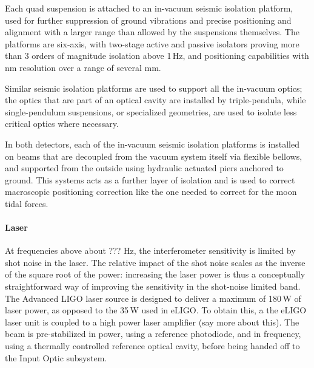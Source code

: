 Each quad suspension is attached to an in-vacuum seismic isolation platform, 
used for further suppression of ground vibrations and precise positioning and 
alignment with a larger range than allowed by the suspensions themselves. The 
platforms are six-axis, with two-stage active and passive isolators proving more 
than 3 orders of magnitude isolation above 1\,Hz, and positioning capabilities 
with nm resolution over a range of several mm.

Similar seismic isolation platforms are used to support all the in-vacuum optics; 
the optics that are part of an optical cavity are installed by triple-pendula, while 
single-pendulum suspensions, or specialized geometries, are used to isolate 
less critical optics where necessary.

In both detectors, each of the in-vacuum seismic isolation platforms is 
installed on beams that are decoupled from the vacuum system itself via 
flexible bellows, and supported from the outside using hydraulic actuated 
piers anchored to ground. This systems acts as a further layer of isolation 
and is used to correct macroscopic positioning correction like the one needed 
to correct for the moon tidal forces.


\paragraph*{Laser}
At frequencies above about ??? Hz, the interferometer sensitivity is limited by shot 
noise in the laser. The relative impact of the shot noise scales as the inverse of the 
square root of the power: increasing the laser power is thus a conceptually 
straightforward way of improving the sensitivity in the shot-noise limited band. 
The Advanced LIGO laser source is designed to deliver a maximum of 180\,W of 
laser power, as opposed to the 35\,W used in eLIGO. To obtain this, a the eLIGO 
laser unit is coupled to a high power laser amplifier (say more about this). The 
beam is pre-stabilized in power, using a reference photodiode, and in frequency, 
using a thermally controlled reference optical cavity, before being handed off to the Input Optic subsystem.

